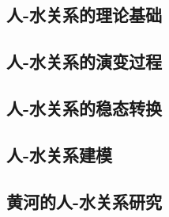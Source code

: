 \subsection{人-水关系的理论基础}\label{ch1:sec:theories}


\subsection{人-水关系的演变过程}\label{ch1:sec:process}


\subsection{人-水关系的稳态转换}\label{ch1:sec:mechanism}


\subsection{人-水关系建模}\label{ch1:sec:model}


\subsection{黄河的人-水关系研究}\label{ch1:sec:yellow_river}
